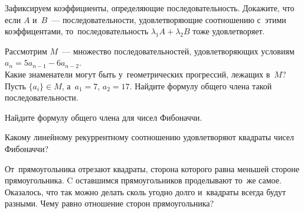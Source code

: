 \begin{problems}

\item
Зафиксируем коэффициенты, определяющие последовательность.
Докажите, что если $A$ и~$B$~--- последовательности, удовлетворяющие
соотношению с~этими коэффицентами, то~последовательность
$\lambda_1 A + \lambda_2 B$ тоже удовлетворяет.

\item
Рассмотрим $M$~--- множество последовательностей, удовлетворяющих условиям
$a_{n} = 5 a_{n-1} - 6 a_{n-2}$.
\\
\subproblem
Какие знаменатели могут быть у~геометрических прогрессий, лежащих в~$M$?
\\
\subproblem
Пусть $\{ a_i \} \in M$, а~$a_1 = 7$, $a_2 = 17$.
Найдите формулу общего члена такой последовательности.

\item
Найдите формулу общего члена для чисел Фибоначчи.

\item
Какому линейному рекуррентному соотношению удовлетворяют квадраты чисел
Фибоначчи?

\item
От~прямоугольника отрезают квадраты, сторона которого равна меньшей стороне
прямоугольника.
C оставшимся прямоугольников проделывают то~же самое.
Оказалось, что так можно делать сколь угодно долго и~квадраты всегда будут
разными.
Чему равно отношение сторон прямоугольника?

\end{problems}

